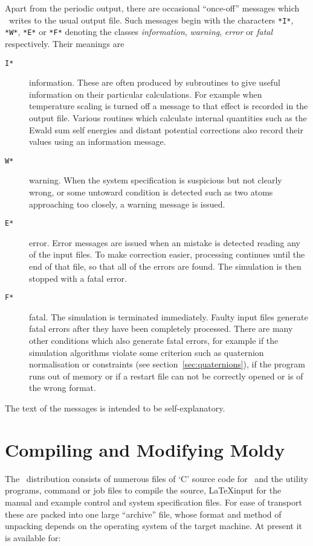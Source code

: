 Apart from the periodic output, there are occasional ``once-off''
messages which \moldy\  writes to the usual output file.  Such messages
begin with the characters \verb'*I*', \verb'*W*', \verb'*E*' or
\verb'*F*' denoting the classes {\em information}, {\em warning}, {\em
error} or {\em fatal} respectively.  Their meanings are
\begin{description}
\item[{\tt*I*}] information. These are often produced by subroutines
to give useful information on their particular calculations.  For
example when temperature scaling is turned off a message to that
effect is recorded in the output file.  Various routines which
calculate internal quantities such as the Ewald sum self energies and
distant potential corrections also record their values using an
information message.
\item[{\tt*W*}] warning.  When the system specification is suspicious
but not clearly wrong, or some untoward condition is detected such as
two atoms approaching too closely, a warning message is issued.
\item[{\tt*E*}] error. Error messages are issued when an mistake is
detected reading any of the input files. To make correction easier,
processing continues until the end of that file, so that all of the
errors are found.  The simulation is then stopped with a fatal error.
\item[{\tt*F*}] fatal. The simulation is terminated immediately. Faulty 
input files generate fatal errors after they have been completely
processed.  There are many other conditions which also generate fatal
errors, for example if the simulation algorithms violate some
criterion such as quaternion normalisation or constraints (see
section~\ref{sec:quaternions}), if the program runs out of memory or
if a restart file can not be correctly opened or is of the wrong
format.
\end{description}
The text of the messages is intended to be self-explanatory.

\chapter{Compiling and Modifying Moldy}
The \moldy\  distribution consists of numerous files of `C' source code
for \moldy\  and the utility programs, command or job files to compile
the source, \LaTeX input for the manual and example control and system
specification files.  For ease of transport these are packed into one
large ``archive'' file, whose format and method of unpacking depends
on the operating system of the target machine.  At present it is
available for:

